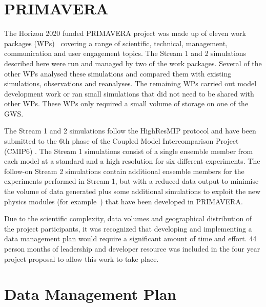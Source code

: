 \documentclass[gmd, manuscript]{copernicus}
\begin{document}
\section{PRIMAVERA}

The Horizon 2020 funded PRIMAVERA project was made up of eleven work packages (WPs)~\citep{GrantAgree} covering a range of scientific, technical, management, communication and user engagement topics. The Stream 1 and 2 simulations described here were run and managed by two of the work packages. Several of the other WPs analysed these simulations and compared them with existing simulations, observations and reanalyses. The remaining WPs carried out model development work or ran small simulations that did not need to be shared with other WPs. These WPs only required a small volume of storage on one of the GWS.

The Stream 1 and 2 simulations follow the HighResMIP protocol and have been submitted to the 6th phase of the Coupled Model Intercomparison Project (CMIP6) \citep{Eyring2016}. The Stream 1 simulations consist of a single ensemble member from each model at a standard and a high resolution for six different experiments. The follow-on Stream 2 simulations contain additional ensemble members for the experiments performed in Stream 1, but with a reduced data output to minimise the volume of data generated plus some additional simulations to exploit the new physics modules (for example~\citep{Nurser2020}) that have been developed in PRIMAVERA.

Due to the scientific complexity, data volumes and geographical distribution of the project participants, it was recognized that developing and implementing a data management plan would require a significant amount of time and effort. 44 person months of leadership and developer resource was included in the four year project proposal to allow this work to take place.


\section{Data Management Plan}
\end{document}

